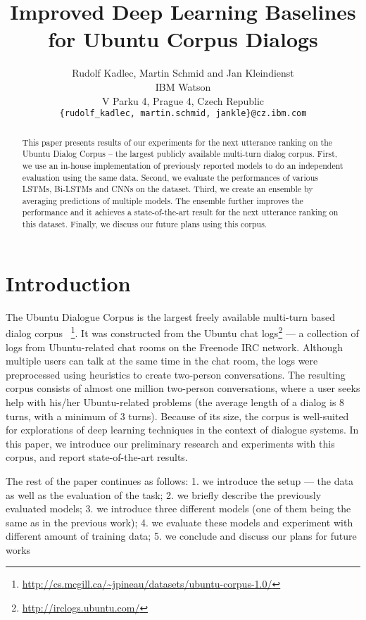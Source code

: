 \documentclass{article} \usepackage{nips15submit_e,times}
\title{Improved Deep Learning Baselines for Ubuntu Corpus Dialogs}
\author{
Rudolf Kadlec, Martin Schmid and Jan Kleindienst \\
IBM Watson\\
V Parku 4, Prague 4, Czech Republic\\
\texttt{\{rudolf\_kadlec, martin.schmid, jankle\}@cz.ibm.com} \\
}
\newcommand{\MARTINSECOND}[1]{{\color{black}#1}} \newcommand{\MARTINTHIRD}[1]{{\color{black}#1}} \newcommand{\COPY}[1]{{\color{black}[#1]}}
\begin{document}
\maketitle

\begin{abstract}
\MARTINSECOND{
This paper presents results of our experiments for the next utterance ranking on the Ubuntu Dialog Corpus -- the largest publicly available multi-turn dialog corpus.
First, we use an in-house implementation of previously reported models to do an independent evaluation using the same data.
Second, we evaluate the performances of various LSTMs, Bi-LSTMs and CNNs on the dataset.
Third, we create an ensemble by averaging predictions of multiple models. The ensemble further improves the performance and it achieves a state-of-the-art result for the next utterance ranking on this dataset.
Finally, we discuss our future plans using this corpus.
}
\end{abstract}


\section{Introduction}



\MARTINSECOND
{
The Ubuntu Dialogue Corpus is the largest freely available multi-turn based dialog corpus ~\cite{lowe2015ubuntu}\footnote{\url{http://cs.mcgill.ca/~jpineau/datasets/ubuntu-corpus-1.0/}}.
It was constructed from the Ubuntu chat logs\footnote{\url{http://irclogs.ubuntu.com/}} --- a collection of logs from Ubuntu-related chat rooms on the Freenode IRC network.
Although multiple users can talk at the same time in the chat room, the logs were preprocessed using heuristics to create two-person conversations.
The resulting corpus consists of almost one million two-person conversations, where a user seeks help with his/her Ubuntu-related problems
(the average length of a dialog is $8$ turns, with a minimum of 3 turns).
Because of its size, the corpus is well-suited for explorations of deep learning techniques in the context of dialogue systems.
In this paper, we introduce our preliminary research and experiments with this corpus, and report state-of-the-art results.

The rest of the paper continues as follows: 
1. we introduce the setup --- the data as well as the evaluation of the task;
2. we briefly describe the previously evaluated  models;
3. we introduce three different models (one of them being the same as in the previous work);
4. we evaluate these models and experiment with different amount of training data;
5. we conclude and discuss our plans for future works
}
\end{document}

